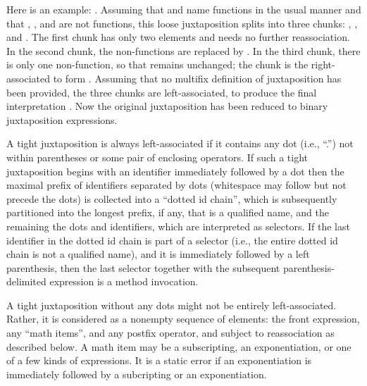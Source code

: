 Here is an example: .  Assuming that
\EXP{\sin} and \EXP{\log} name functions in the usual manner and that
, , and  are not functions, this loose juxtaposition
splits into three chunks: , 
, and .
The first chunk has only two elements and needs no further reassociation.
In the second chunk, the non-functions  are replaced by
.
In the third chunk, there is only one non-function, so that remains unchanged;
the chunk is the right-associated to form .  Assuming
that no multifix definition of juxtaposition has been provided,
the three chunks are left-associated, to produce the final interpretation
.  Now the original
juxtaposition has been reduced to binary juxtaposition expressions.


A tight juxtaposition is always left-associated if it contains any dot
(i.e., ``.'') not within parentheses or some pair of enclosing operators.
If such a tight juxtaposition begins with an identifier immediately followed by
a dot then the maximal prefix of identifiers separated by dots (whitespace may
follow but not precede the dots) is collected into a ``dotted id chain'',
which is subsequently partitioned into
the longest prefix, if any, that is a qualified name, and the remaining
the dots and identifiers, which are interpreted as selectors.  If the last
identifier in the dotted id chain
is part of a selector (i.e., the entire dotted id chain is not a
qualified name), and it
is immediately followed by a left parenthesis, then the last selector together
with the subsequent parenthesis-delimited expression is a method invocation.


A tight juxtaposition without any dots might not be entirely left-associated.
Rather, it is considered as a nonempty sequence of elements: the front
expression, any ``math items'', and any postfix operator, and subject to
reassociation as described below.  A math item may be a subscripting,
an exponentiation, or one of a few kinds of expressions.
It is a static error if an exponentiation is immediately followed by
a subcripting or an exponentiation.

